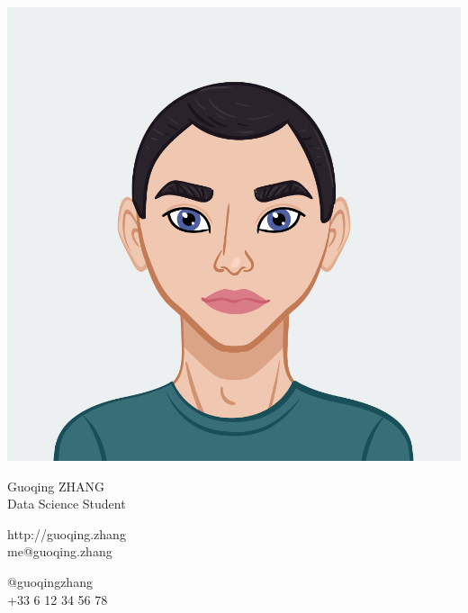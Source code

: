 \documentclass{article}
\begin{document}
\centering \includegraphics[width=.25\linewidth]{logo}\\[3pt]
\parbox{2in}{\Large \centering Guoqing ZHANG\\[1pt]
\normalsize Data Science Student}

\vfill
\raggedright
\begin{multicols}{2}
http://guoqing.zhang\\
me@guoqing.zhang

\columnbreak
\raggedleft
@guoqingzhang\\
+33 6 12 34 56 78%
\end{multicols}%
\end{document}
